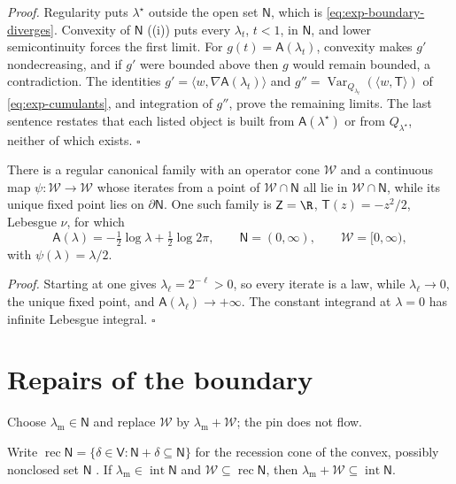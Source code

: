 \noindent\emph{Proof.}
Regularity puts \(\lambda^\star\) outside the open set \(\mathsf N\), which is
\eqref{eq:exp-boundary-diverges}. Convexity of \(\mathsf N\)
((i)) puts every \(\lambda_t\), \(t<1\), in
\(\mathsf N\), and lower semicontinuity forces the first limit. For
\(g(t)=\mathsf A(\lambda_t)\), convexity makes \(g'\) nondecreasing, and if
\(g'\) were bounded above then \(g\) would remain bounded, a contradiction.
The identities \(g'=\langle w,\nabla\mathsf A(\lambda_t)\rangle\) and
\(g''=\operatorname{Var}_{Q_{\lambda_t}}(\langle w,\mathsf T\rangle)\) of
\eqref{eq:exp-cumulants}, and integration of \(g''\), prove the remaining
limits. The last sentence restates that each listed object is built from
\(\mathsf A(\lambda^\star)\) or from \(Q_{\lambda^\star}\), neither of which
exists. \(\square\)

There is a regular canonical family with an operator cone \(\mathcal W\) and a
continuous map \(\psi:\mathcal W\to\mathcal W\) whose iterates from a point of
\(\mathcal W\cap\mathsf N\) all lie in \(\mathcal W\cap\mathsf N\), while its
unique fixed point lies on \(\partial\mathsf N\). One such family is
\(\mathsf Z=\R\), \(\mathsf T(z)=-z^2/2\), Lebesgue \(\nu\), for which
\begin{equation}
\mathsf A(\lambda)=-\tfrac12\log\lambda+\tfrac12\log2\pi,
\qquad
\mathsf N=(0,\infty),
\qquad
\mathcal W=[0,\infty),
\label{eq:exp-scale-witness}
\end{equation}
with \(\psi(\lambda)=\lambda/2\). 

\noindent\emph{Proof.}
Starting at one gives \(\lambda_\ell=2^{-\ell}>0\), so every iterate is a law,
while \(\lambda_\ell\to0\), the unique fixed point, and
\(\mathsf A(\lambda_\ell)\to+\infty\). The constant integrand at
\(\lambda=0\) has infinite Lebesgue integral. \(\square\)

\section{Repairs of the boundary}
\label{sec:exp-repairs}

Choose \(\lambda_{\mathrm m}\in\mathsf N\) and replace \(\mathcal W\) by
\(\lambda_{\mathrm m}+\mathcal W\); the pin does not flow.

Write
\(\operatorname{rec}\mathsf N=\{\delta\in\mathsf V:\mathsf N+\delta\subseteq\mathsf N\}\)
for the recession cone of the convex, possibly nonclosed set \(\mathsf N\)
\citep[Theorem~8.1]{Rockafellar1970}. If
\(\lambda_{\mathrm m}\in\operatorname{int}\mathsf N\) and
\(\mathcal W\subseteq\operatorname{rec}\mathsf N\), then
\(\lambda_{\mathrm m}+\mathcal W\subseteq\operatorname{int}\mathsf N\).

